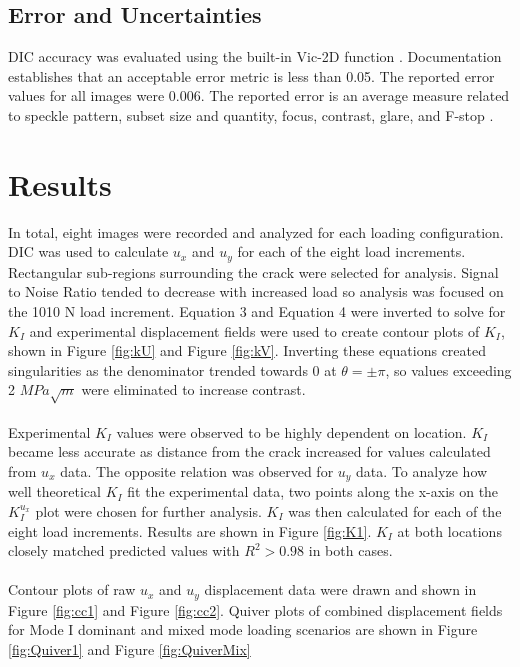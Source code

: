 \documentclass[12pt]{article}
\begin{document}
\subsection{Error and Uncertainties} %
DIC accuracy was evaluated using the built-in Vic-2D function \cite{Vic-2D}. Documentation establishes that an acceptable error metric is less than 0.05. The reported error values for all images were 0.006. The reported error is an average measure related to speckle pattern, subset size and quantity, focus, contrast, glare, and F-stop \cite{DIC_Err}.  

\section{Results}%
In total, eight images were recorded and analyzed for each loading configuration. DIC was used to calculate $u_x$ and $u_y$ for each of the eight load increments. Rectangular sub-regions surrounding the crack were selected for analysis. Signal to Noise Ratio tended to decrease with increased load so analysis was focused on the 1010 N load increment. Equation 3 and Equation 4 were inverted to solve for $K_I$ and experimental displacement fields were used to create contour plots of $K_I$, shown in Figure \ref{fig:kU} and Figure \ref{fig:kV}. Inverting these equations created singularities as the denominator trended towards 0 at $\theta = \pm \pi$, so values exceeding 2 $MPa\sqrt{m}$ were eliminated to increase contrast. 
\\ \\
Experimental $K_I$ values were observed to be highly dependent on location. $K_I$ became less accurate as distance from the crack increased for values calculated from $u_x$ data. The opposite relation was observed for $u_y$ data. To analyze how well theoretical $K_I$ fit the experimental data, two points along the x-axis on the $K_I^{u_x}$ plot were chosen for further analysis. $K_I$ was then calculated for each of the eight load increments. Results are shown in Figure \ref{fig:K1}. $K_I$ at both locations closely matched predicted values with $R^2>0.98$ in both cases. 
\\ \\
Contour plots of raw $u_x$ and $u_y$ displacement data were drawn and shown in Figure \ref{fig:cc1} and Figure \ref{fig:cc2}. Quiver plots of combined displacement fields for Mode I dominant and mixed mode loading scenarios are shown in Figure \ref{fig:Quiver1} and Figure \ref{fig:QuiverMix}
\end{document}
